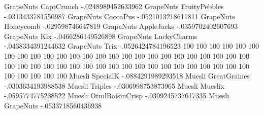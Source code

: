 GrapeNuts	CaptCrunch	-.0248989452633962
GrapeNuts	FruityPebbles	-.0313433781550987
GrapeNuts	CocoaPus	-.0521013218611811
GrapeNuts	Honeycomb	-.029598746647819
GrapeNuts	AppleJacks	-.0359702402607693
GrapeNuts	Kix	-.0466286149526898
GrapeNuts	LuckyCharms	-.0438334391244632
GrapeNuts	Trix	-.0526424784196523
100%
100%
100%
100%
100%
100%
100%
100%
100%
100%
100%
100%
100%
100%
100%
100%
100%
100%
100%
100%
100%
100%
100%
100%
100%
100%
100%
100%
100%
100%
100%
100%
100%
100%
100%
100%
100%
100%
100%
100%
100%
100%
100%
100%
100%
100%
100%
100%
100%
Muesli	SpecialK	-.0884291989293518
Muesli	GreatGraines	-.0303634193988538
Muesli	Triples	-.0306998753873965
Muesli	Mueslix	-.0595774775238522
Muesli	OtmlRaisinCrisp	-.0309245737617335
Muesli	GrapeNuts	-.0533718560436938
